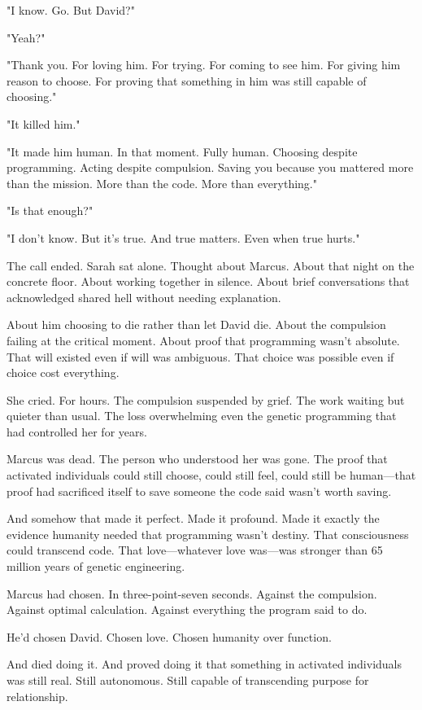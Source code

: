 "I know. Go. But David?"

"Yeah?"

"Thank you. For loving him. For trying. For coming to see him. For giving him reason to choose. For proving that something in him was still capable of choosing."

"It killed him."

"It made him human. In that moment. Fully human. Choosing despite programming. Acting despite compulsion. Saving you because you mattered more than the mission. More than the code. More than everything."

"Is that enough?"

"I don't know. But it's true. And true matters. Even when true hurts."

The call ended. Sarah sat alone. Thought about Marcus. About that night on the concrete floor. About working together in silence. About brief conversations that acknowledged shared hell without needing explanation.

About him choosing to die rather than let David die. About the compulsion failing at the critical moment. About proof that programming wasn't absolute. That will existed even if will was ambiguous. That choice was possible even if choice cost everything.

She cried. For hours. The compulsion suspended by grief. The work waiting but quieter than usual. The loss overwhelming even the genetic programming that had controlled her for years.

Marcus was dead. The person who understood her was gone. The proof that activated individuals could still choose, could still feel, could still be human—that proof had sacrificed itself to save someone the code said wasn't worth saving.

And somehow that made it perfect. Made it profound. Made it exactly the evidence humanity needed that programming wasn't destiny. That consciousness could transcend code. That love—whatever love was—was stronger than 65 million years of genetic engineering.

Marcus had chosen. In three-point-seven seconds. Against the compulsion. Against optimal calculation. Against everything the program said to do.

He'd chosen David. Chosen love. Chosen humanity over function.

And died doing it. And proved doing it that something in activated individuals was still real. Still autonomous. Still capable of transcending purpose for relationship.

